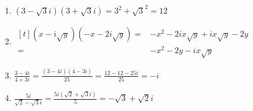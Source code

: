 \documentclass{homework}
\begin{document}
\maketitle


\begin{enumerate}
  \item \((3-\sqrt{3}i)(3+\sqrt{3}i)=3^2+\sqrt{3}^2=12\)
  \item \(\begin{aligned}[t](x-i\sqrt{y})(-x-2i\sqrt{y})=&-x^2-2ix\sqrt{y}+ix\sqrt{y}-2y\\=&-x^2-2y-ix\sqrt{y}\end{aligned}\)
  \item \(\frac{3-4i}{4+3i}=\frac{(3-4i)(4-3i)}{25}=\frac{12-12-25i}{25}=-i\)
  \item \(\frac{5i}{\sqrt{2}-\sqrt{3}i}=\frac{5i(\sqrt{2}+\sqrt{3}i)}{5}=-\sqrt{3}+\sqrt{2}i\)
\end{enumerate}

\end{document}
